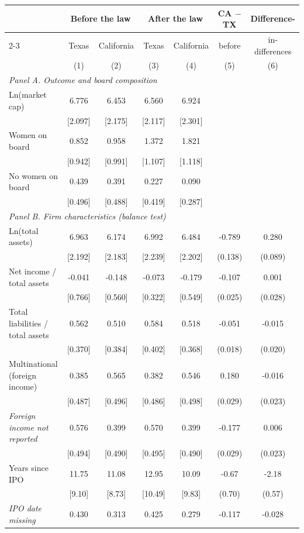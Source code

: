 \begin{tabular}{lcccccc}
\hline\hline
 & \multicolumn{2}{c}{Before the law} & \multicolumn{2}{c}{After the law} & CA $-$ TX & Difference- \\
\cline{2-3} \cline{4-5}
 & Texas & California & Texas & California & before & in-differences \\
 & (1) & (2) & (3) & (4) & (5) & (6) \\
\hline
\multicolumn{7}{l}{\textit{Panel A. Outcome and board composition}} \\
Ln(market cap) & 6.776 & 6.453 & 6.560 & 6.924 &  &  \\
 & [2.097] & [2.175] & [2.117] & [2.301] &  &  \\
Women on board & 0.852 & 0.958 & 1.372 & 1.821 &  &  \\
 & [0.942] & [0.991] & [1.107] & [1.118] &  &  \\
No women on board & 0.439 & 0.391 & 0.227 & 0.090 &  &  \\
 & [0.496] & [0.488] & [0.419] & [0.287] &  &  \\
\multicolumn{7}{l}{\textit{Panel B. Firm characteristics (balance test)}} \\
Ln(total assets) & 6.963 & 6.174 & 6.992 & 6.484 & -0.789 & 0.280 \\
 & [2.192] & [2.183] & [2.239] & [2.202] & (0.138) & (0.089) \\
Net income / total assets & -0.041 & -0.148 & -0.073 & -0.179 & -0.107 & 0.001 \\
 & [0.766] & [0.560] & [0.322] & [0.549] & (0.025) & (0.028) \\
Total liabilities / total assets & 0.562 & 0.510 & 0.584 & 0.518 & -0.051 & -0.015 \\
 & [0.370] & [0.384] & [0.402] & [0.368] & (0.018) & (0.020) \\
Multinational (foreign income) & 0.385 & 0.565 & 0.382 & 0.546 & 0.180 & -0.016 \\
 & [0.487] & [0.496] & [0.486] & [0.498] & (0.029) & (0.023) \\
\quad \textit{Foreign income not reported} & 0.576 & 0.399 & 0.570 & 0.399 & -0.177 & 0.006 \\
 & [0.494] & [0.490] & [0.495] & [0.490] & (0.029) & (0.023) \\
Years since IPO & 11.75 & 11.08 & 12.95 & 10.09 & -0.67 & -2.18 \\
 & [9.10] & [8.73] & [10.49] & [9.83] & (0.70) & (0.57) \\
\quad \textit{IPO date missing} & 0.430 & 0.313 & 0.425 & 0.279 & -0.117 & -0.028 \\

\end{tabular}
